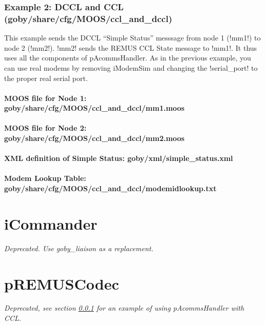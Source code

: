 \subsubsection{Example 2: DCCL and CCL (goby/share/cfg/MOOS/ccl\_and\_dccl)}\label{sec:ccl_dccl_example}
This example sends the DCCL ``Simple Status'' messsage from node 1 (!mm1!) to node 2 (!mm2!). !mm2! sends the REMUS CCL State message to !mm1!. It thus uses all the components of pAcommsHandler. As in the previous example, you can use real modems by removing iModemSim and changing the !serial_port! to the proper real serial port.

\paragraph{MOOS file for Node 1: goby/share/cfg/MOOS/ccl\_and\_dccl/mm1.moos}
\resetbvlinenumber

\paragraph{MOOS file for Node 2: goby/share/cfg/MOOS/ccl\_and\_dccl/mm2.moos}
\resetbvlinenumber

\paragraph{XML definition of Simple Status: goby/xml/simple\_status.xml}
\resetbvlinenumber

\paragraph{Modem Lookup Table: goby/share/cfg/MOOS/ccl\_and\_dccl/modemidlookup.txt}
\resetbvlinenumber

\section{iCommander}\label{sec:icommander} 

\textit{Deprecated. Use goby\_liaison as a replacement.}

\section{pREMUSCodec}

\textit{Deprecated, see section \ref{sec:ccl_dccl_example} for an example of using pAcommsHandler with CCL.}

\DeleteShortVerb{\!}
